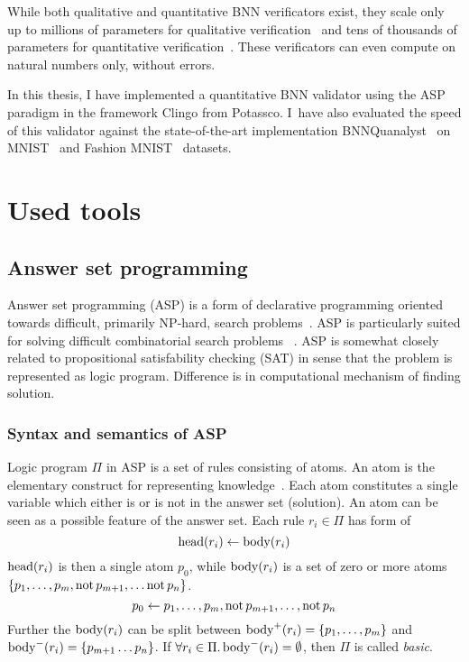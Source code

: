 \documentclass{fithesis}
\begin{document}
While both qualitative and quantitative BNN verificators exist,
they scale only up to millions of parameters for qualitative verification~\cite{10.1007/978-3-030-03592-1_16}
and tens of thousands of parameters for quantitative verification~\cite{10.1145/3563212}.
These verificators can even compute on natural numbers only, without errors.

In this thesis, I have implemented a quantitative BNN validator using the ASP paradigm
in the framework Clingo from Potassco. I~have also evaluated the speed of this
validator against the state-of-the-art implementation BNNQuanalyst~\cite{10.1145/3563212}
on MNIST~\cite{mnist2017} and Fashion MNIST~\cite{xiao2017fashion} datasets.


\chapter{Used tools}

\section{Answer set programming}

Answer set programming (ASP) is a form of declarative
programming oriented towards difficult, primarily NP-hard,
search problems~\cite{lifschitz2008answer}.
ASP is particularly suited for solving difficult combinatorial search problems%
~\cite{anger2005glimpse}.
ASP is somewhat closely related to propositional
satisfability checking (SAT)
in sense that the problem is represented as logic program. Difference is in
computational mechanism of finding solution.

\subsection{Syntax and semantics of ASP}

Logic program $\Pi$ in ASP is a set of rules consisting of atoms.
An atom is the elementary construct for representing knowledge~\cite{Delgrande}.
Each atom constitutes a single variable which either is or is not in the answer
set (solution). An atom can be seen as a possible feature of the answer set.
Each rule $r_i\in \Pi$ has form of
\begin{equation}
    \mathrm{head}(r_i) \leftarrow{} \mathrm{body}(r_i)
\end{equation}
$\mathrm{head}(r_i)$ is then a single atom $p_0$, while $\mathrm{body}(r_i)$ is a set of zero
or more atoms $\{p_1, \dots, p_m, \mathrm{not}\, p_{m+1}, \dots \mathrm{not}\, p_n\}$.
\begin{equation}
    p_0 \leftarrow{} p_1, \dots, p_m, \mathrm{not}\, p_{m+1}, \dots, \mathrm{not}\, p_n
\end{equation}
Further the $\mathrm{body}(r_i)$ can be split between
$\mathrm{body}^+(r_i) = \{p_1, \dots, p_m\}$
and $\mathrm{body}^-(r_i) = \{p_{m+1}\dots p_n\}$.
If $\forall r_i \in \Pi.\, \mathrm{body}^-(r_i) = \emptyset$, then $\Pi$
is called \textit{basic}.
\end{document}

